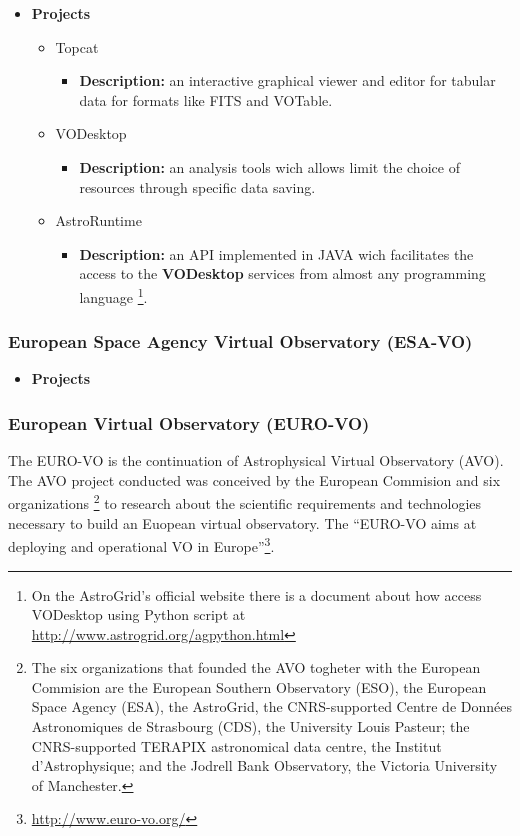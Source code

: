 \begin{itemize}
	\item \textbf{Projects}
	\begin{itemize}
		\item Topcat
			\begin{itemize}
				\item \textbf{Description:} an interactive graphical viewer and
editor for tabular data for formats like FITS and VOTable.
			\end{itemize}
		\item VODesktop
			\begin{itemize}
				\item \textbf{Description:} an analysis tools wich allows limit
the choice of resources through specific data saving.
			\end{itemize}
		\item AstroRuntime
			\begin{itemize}
				\item \textbf{Description:} an API implemented in JAVA wich
facilitates the access to the \textbf{VODesktop} services from almost any
programming language \footnote{On the AstroGrid's official website there is a
document about how access VODesktop using Python script at
\url{http://www.astrogrid.org/agpython.html}}.
			\end{itemize}
	\end{itemize}
\end{itemize}

\subsubsection{European Space Agency Virtual Observatory (ESA-VO)}
\begin{itemize}
	\item \textbf{Projects}
\end{itemize}

\subsubsection{European Virtual Observatory (EURO-VO)}
The EURO-VO is the continuation of Astrophysical Virtual Observatory (AVO). The
AVO project conducted was conceived by the European Commision and six
organizations \footnote{The six organizations that founded the AVO togheter with
the European Commision are the European Southern Observatory (ESO), the European
Space Agency (ESA), the AstroGrid, the CNRS-supported Centre de Données
Astronomiques de Strasbourg (CDS), the University Louis Pasteur; the
CNRS-supported TERAPIX astronomical data centre, the Institut d'Astrophysique;
and the Jodrell Bank Observatory, the Victoria University of Manchester.} to
research about the scientific requirements and technologies necessary to build
an Euopean virtual observatory. The ``EURO-VO aims at deploying and operational
VO in Europe''\footnote{\url{http://www.euro-vo.org/}}.\\

